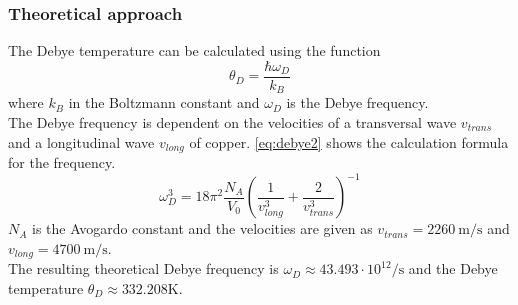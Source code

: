 \subsubsection{Theoretical approach}
The Debye temperature can be calculated using the function
\begin{equation}
    \theta_D = \frac{\hbar\omega_D}{k_B}
    \label{eq:debye1}
\end{equation}
where $k_B$ in the Boltzmann constant and  $\omega_D$ is the Debye frequency.\\
The Debye frequency is dependent on the velocities of a transversal wave $v_{trans}$ and a longitudinal wave $v_{long}$ of copper.
\autoref{eq:debye2} shows the calculation formula for the frequency.
\begin{equation}
    \omega_D^3 = 18\pi^2 \frac{N_A}{V_0}\left(\frac{1}{v^3_{long}}+\frac{2}{v^3_{trans}}\right)^{-1}
    \label{eq:debye2}
\end{equation}
$N_A$ is the Avogardo constant and the velocities are given as $v_{trans} = \SI{2260}{\metre\per\second}$ and $v_{long} = \SI{4700}{\metre\per\second}$\cite{V47}.\\
\newline
The resulting theoretical Debye frequency is $\omega_D \approx 43.493\cdot 10^{12}\si{\per\second}$ and the Debye temperature $\theta_D \approx 332.208\si{\kelvin}$.